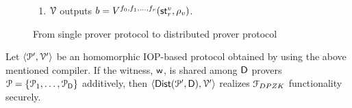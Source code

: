 \begin{figure}[h!]
{{\begin{framed}
\begin{enumerate}[{\rm 1.}]
\begin{enumerate}
					\end{enumerate}
					\item $\mathcal{V}$ outputs $b = V^{f_0, f_1, \ldots, f_r} ( \mathsf{st}^v_r , \rho_v)$.
				\end{enumerate}
		\end{framed}}
		\caption{From single prover protocol to distributed prover protocol}
		\label{fig:DistPV}
	}
\end{figure}

\begin{lemma}\label{lemma:generic_dpzk}
	Let $\langle \mathcal{P}',\mathcal{V}'\rangle$ be an homomorphic IOP-based protocol obtained by using the above mentioned compiler. If the witness, $\mathsf{w}$, is shared among $\mathsf{D}$ provers $\mathcal{P} = \{\mathcal{P}_1, \ldots, \mathcal{P}_{\mathsf{D}}\}$ additively, then $\langle \mathsf{Dist}(\mathcal{P}', \mathsf{D}),\mathcal{V}'\rangle$  realizes $\mathcal{F}_{DPZK}$ functionality securely.
\end{lemma}
	
